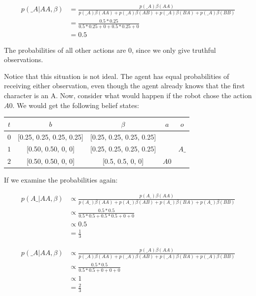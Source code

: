 \documentclass[conference]{IEEEtran}
\begin{document}
\begin{align*}
	p(\_A | AA, \beta) &= \frac{ p(\_A)\beta(AA) }{ p(\_A)\beta(AA) + p(\_A)\beta(AB) + p(\_A)\beta(BA) + p(\_A)\beta(BB)} \\
	&= \frac{0.5 * 0.25}{0.5 * 0.25 + 0 + 0.5 * 0.25 + 0} \\
	&= 0.5
\end{align*}

The probabilities of all other actions are 0, since we only give truthful observations.

Notice that this situation is not ideal. The agent has equal probabilities of receiving either observation, even though the agent already knows that the first character is an A. Now, consider what would happen if the robot chose the action $A0$. We would get the following belief states: 


\begin{center}
\begin{tabular}{|c| c| c| c | c|}
	\hline
	$t$ & $b$ & $\beta$ & $a$ & $o$ \\
	\hline
	$0$ & [0.25, 0.25, 0.25, 0.25] & [0.25, 0.25, 0.25, 0.25] & & \\
	\hline
	$1$ & [0.50, 0.50, 0, 0] & [0.25, 0.25, 0.25, 0.25] & & $A\_$ \\
	\hline
	$2$ & [0.50, 0.50, 0, 0] & [0.5, 0.5, 0, 0] & $A0$  &  \\
	\hline
\end{tabular}
\end{center}

If we examine the probabilities again: 

\begin{align*}
	p(A\_|AA, \beta) &\propto \frac{ p(A\_)\beta(AA) }{ p(A\_)\beta(AA) + p(A\_)\beta(AB) + p(A\_)\beta(BA) + p(A\_)\beta(BB)} \\
	&\propto \frac{0.5 * 0.5}{0.5 * 0.5 + 0.5 * 0.5 + 0 + 0} \\
	&\propto 0.5 \\
	&= \frac{1}{3}
\end{align*}

\begin{align*}
	p(\_A|AA, \beta) &\propto \frac{ p(\_A)\beta(AA) }{ p(\_A)\beta(AA) + p(\_A)\beta(AB) + p(\_A)\beta(BA) + p(\_A)\beta(BB)} \\
	&\propto \frac{0.5 * 0.5}{0.5 * 0.5 + 0 + 0 + 0} \\
	&\propto 1 \\
	&= \frac{2}{3}
\end{align*}
 
\end{document}
